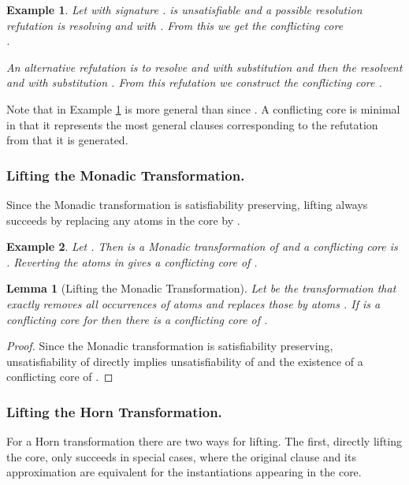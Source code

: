 \documentclass{llncs}
\newtheorem{lem}[theorem]{Lemma}
\newtheorem{exmp}{Example}
\begin{document}
\begin{exmp}\label{coreex}
Let   with signature . 
 is unsatisfiable and  a possible resolution refutation is resolving  
and  with . From this we get the conflicting core \\
.

An alternative refutation is to resolve   and  with 
substitution  
and then the resolvent and  with substitution . 
From this refutation we construct the conflicting core  
  .

\end{exmp} 

Note that in Example \ref{coreex}   is more general than  since .
A conflicting core is minimal in that it represents the most general clauses corresponding to the refutation from that it is generated.

\subsubsection{Lifting the Monadic Transformation.}
Since the Monadic transformation is satisfiability preserving, lifting always succeeds by replacing any  atoms in the core  by .

\begin{exmp}\label{LiftMonadicEx}
Let  . 
Then   is a Monadic transformation of 
and a conflicting core is   .
Reverting the atoms in   gives    a conflicting core of .
\end{exmp} 


\begin{lem}[Lifting the Monadic Transformation]\label{liftmonadic}
Let  be the transformation  that exactly removes all occurrences of atoms  and replaces those by atoms .
If  is a conflicting core for  then there is a conflicting core  of .
\end{lem}

\begin{proof}
Since the Monadic transformation is satisfiability preserving, unsatisfiability of  directly implies unsatisfiability of  and the existence of a conflicting core of .
\end{proof}

\subsubsection{Lifting the Horn Transformation.}
For a Horn transformation there are two ways for lifting.
The first, directly lifting the core, only succeeds in special cases, where the original clause and its approximation are  equivalent 
for the instantiations appearing in the core.
\end{document}
